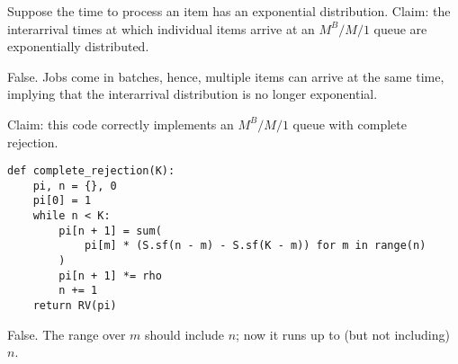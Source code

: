 \documentclass[stochastic-or.tex]{subfiles}
\begin{document}
\begin{truefalse}
Suppose the time to process an item has an exponential distribution.
Claim: the interarrival times at which individual items arrive at an $M^B/M/1$ queue are exponentially distributed.
    \begin{solution}
        False. Jobs come in batches, hence, multiple items can arrive at the same time, implying that the interarrival distribution is no longer exponential.
    \end{solution}
\end{truefalse}




\begin{truefalse}
Claim: this code correctly implements an $M^{B}/M/1$ queue with complete rejection.
\begin{verbatim}
def complete_rejection(K):
    pi, n = {}, 0
    pi[0] = 1
    while n < K:
        pi[n + 1] = sum(
            pi[m] * (S.sf(n - m) - S.sf(K - m)) for m in range(n)
        )
        pi[n + 1] *= rho
        n += 1
    return RV(pi)
\end{verbatim}
\begin{solution}
    False. The range over $m$ should include $n$; now it runs up to (but not including) $n$.
\end{solution}
\end{truefalse}
\end{document}
